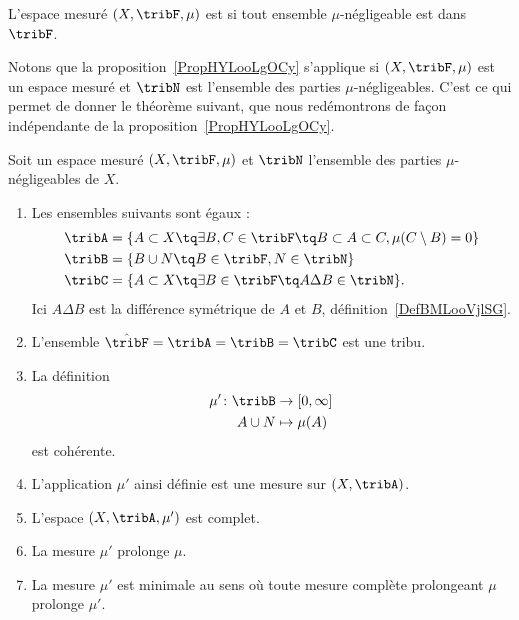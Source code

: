 \begin{definition}  \label{DefBWAoomQZcI}
    L'espace mesuré \( (X,\tribF,\mu)\) est  si tout ensemble \( \mu\)-négligeable est dans \( \tribF\).
\end{definition}

Notons que la proposition~\ref{PropHYLooLgOCy} s'applique si \( (X,\tribF,\mu)\) est un espace mesuré et \( \tribN\) est l'ensemble des parties \( \mu\)-négligeables. C'est ce qui permet de donner le théorème suivant, que nous redémontrons de façon indépendante de la proposition~\ref{PropHYLooLgOCy}.
\begin{theorem}   \label{thoCRMootPojn}
    Soit un espace mesuré \( (X,\tribF,\mu)\) et \( \tribN\) l'ensemble des parties \( \mu\)-négligeables de \( X\).
    \begin{enumerate}
        \item
            Les ensembles suivants sont égaux :
            \begin{subequations}
                \begin{align}
                    \tribA&=\{ A\subset X\tq\exists B,C\in\tribF\tq B\subset A\subset C,\mu(C\setminus B)=0 \}\\
                    \tribB&=\{ B\cup N\tq  B\in\tribF,N\in\tribN \}    \label{EqFJIoorxZNU}\\
                    \tribC&=\{ A\subset X\tq \exists B\in\tribF\tq A\Delta B\in \tribN \}.
                \end{align}
            \end{subequations}
            Ici \( A\Delta B\) est la différence symétrique de \( A\) et \( B\), définition~\ref{DefBMLooVjlSG}.
        \item
            L'ensemble \( \hat\tribF=\tribA=\tribB=\tribC\) est une tribu.
        \item
            La définition
            \begin{equation}
                \begin{aligned}
                    \mu'\colon \tribB&\to \mathopen[ 0 , \infty \mathclose] \\
                    A\cup N&\mapsto \mu(A)
                \end{aligned}
            \end{equation}
            est cohérente.
        \item
            L'application \( \mu'\) ainsi définie est une mesure sur \( (X,\tribA)\).
        \item
            L'espace \( (X,\tribA,\mu')\) est complet.
        \item
            La mesure \( \mu'\) prolonge \( \mu\).
        \item   \label{thoCRMootPojnvii}
            La mesure \( \mu'\) est minimale au sens où toute mesure complète prolongeant \( \mu\) prolonge \( \mu'\).
    \end{enumerate}
\end{theorem}

